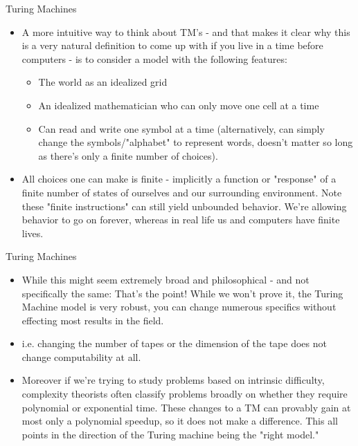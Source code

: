 \documentclass[aspectratio=169]{beamer}
\begin{document}
\begin{frame}{Turing Machines}
  
  \begin{itemize}
    \item A more intuitive way to think about TM's - and that makes it clear why this is a very natural definition to come up with if you live in a time before computers - is to consider a model with the following features: \pause
    \begin{itemize} 
        \item The world as an idealized grid \pause
        \item An idealized mathematician who can only move one cell at a time \pause
        \item Can read and write one symbol at a time (alternatively, can simply change the symbols/"alphabet" to represent words, doesn't matter so long as there's only a finite number of choices). \pause
    \end{itemize} 
    \item All choices one can make is finite - implicitly a function or "response" of a finite number of states of ourselves and our surrounding environment. Note these "finite instructions" can still yield unbounded behavior. We're allowing behavior to go on forever, whereas in real life us and computers have finite lives.
  \end{itemize}
\end{frame}

\begin{frame}{Turing Machines}
  
  \begin{itemize} 
    \item While this might seem extremely broad and philosophical - and not specifically the same: That's the point! While we won't prove it, the Turing Machine model is very robust, you can change numerous specifics without effecting most results in the field. \pause
    \item i.e. changing the number of tapes or the dimension of the tape does not change computability at all. \pause
    \item Moreover if we're trying to study problems based on intrinsic difficulty, complexity theorists often classify problems broadly on whether they require polynomial or exponential time. These changes to a TM can provably gain at most only a polynomial speedup, so it does not make a difference. This all points in the direction of the Turing machine being the "right model."
  \end{itemize}
\end{frame}
\end{document}
